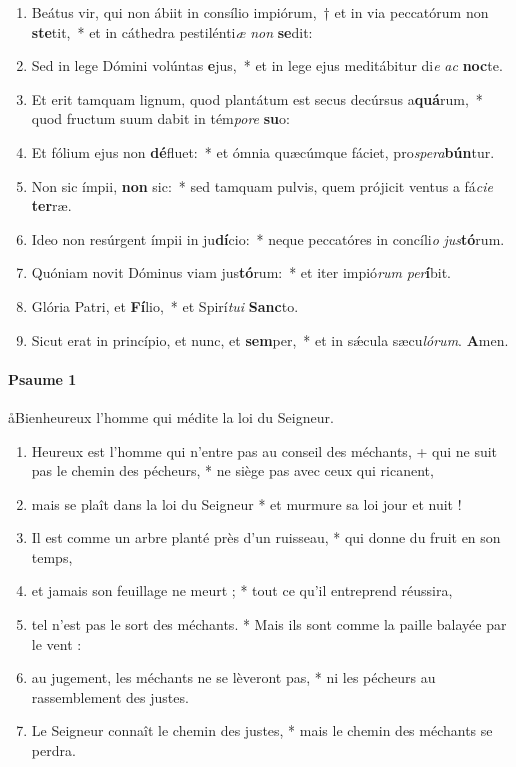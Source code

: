 \documentclass[twoside]{article}
\begin{document}
\begin{paracol}[1]{2}
\begin{enumerate}[wide, itemsep=0mm, labelwidth=!, labelindent=0pt, label=\color{gregoriocolor}\theenumi]
\item Beátus vir, qui non ábiit in consílio impiórum,~† et in via peccatórum non \textbf{ste}tit,~* et in cáthedra pestilénti\textit{æ} \textit{non} \textbf{se}dit:
\item Sed in lege Dómini volúntas \textbf{e}jus,~* et in lege ejus meditábitur di\textit{e} \textit{ac} \textbf{noc}te.
\item Et erit tamquam lignum, quod plantátum est secus decúrsus a\textbf{quá}rum,~* quod fructum suum dabit in tém\textit{po}\textit{re} \textbf{su}o:
\item Et fólium ejus non \textbf{dé}fluet:~* et ómnia quæcúmque fáciet, pro\textit{spe}\textit{ra}\textbf{bún}tur.
\item Non sic ímpii, \textbf{non} sic:~* sed tamquam pulvis, quem prójicit ventus a fá\textit{ci}\textit{e} \textbf{ter}ræ.
\item Ideo non resúrgent ímpii in ju\textbf{dí}cio:~* neque peccatóres in concíli\textit{o} \textit{jus}\textbf{tó}rum.
\item Quóniam novit Dóminus viam jus\textbf{tó}rum:~* et iter impió\textit{rum} \textit{per}\textbf{í}bit.
\item Glória Patri, et \textbf{Fí}lio,~* et Spirí\textit{tu}\textit{i} \textbf{Sanc}to.
\item Sicut erat in princípio, et nunc, et \textbf{sem}per,~* et in sǽcula sæcu\textit{ló}\textit{rum}. \textbf{A}men.
\end{enumerate}

\switchcolumn

\paragraph{Psaume 1}
\aa Bienheureux l'homme qui médite la loi du Seigneur.


\begin{enumerate}[wide, itemsep=0mm, labelwidth=!, labelindent=0pt, label=\color{gregoriocolor}\theenumi]
\item Heureux est l'homme qui n'entre pas au conseil des méchants, + qui ne suit pas le chemin des pécheurs, * ne siège pas avec ceux qui ricanent,
\item mais se plaît dans la loi du Seigneur * et murmure sa loi jour et nuit !
\item Il est comme un arbre planté près d'un ruisseau, * qui donne du fruit en son temps,
\item et jamais son feuillage ne meurt ; * tout ce qu'il entreprend réussira,
\item tel n'est pas le sort des méchants. * Mais ils sont comme la paille balayée par le vent :
\item au jugement, les méchants ne se lèveront pas, * ni les pécheurs au rassemblement des justes.
\item Le Seigneur connaît le chemin des justes, * mais le chemin des méchants se perdra.
\end{enumerate}


\end{paracol}
\end{document}
